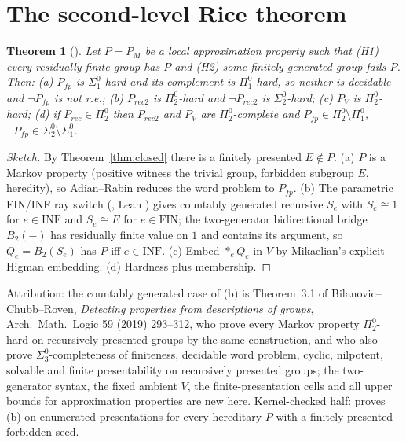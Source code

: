 \documentclass[11pt]{article}
\newtheorem{theorem}{Theorem}[section]
\theoremstyle{definition}
\newcommand{\Pizt}{\Pi^0_2}\newcommand{\Sizt}{\Sigma^0_2}\newcommand{\Pith}{\Pi^0_3}\newcommand{\Sith}{\Sigma^0_3}
\newcommand{\Sio}{\Sigma^0_1}\newcommand{\Pio}{\Pi^0_1}
\begin{document}
\section{The second-level Rice theorem}
\begin{theorem}[]\label{thm:rice}
Let $P=P_M$ be a local approximation property such that (H1) every residually finite group has $P$ and (H2) some finitely generated group fails $P$. Then: (a) $P_{fp}$ is $\Sio$-hard and its complement is $\Pio$-hard, so neither is decidable and $\neg P_{fp}$ is not r.e.; (b) $P_{rec2}$ is $\Pizt$-hard and $\neg P_{rec2}$ is $\Sizt$-hard; (c) $P_V$ is $\Pizt$-hard; (d) if $P_{rec}\in\Pizt$ then $P_{rec2}$ and $P_V$ are $\Pizt$-complete and $P_{fp}\in\Pizt\setminus\Pio$, $\neg P_{fp}\in\Sizt\setminus\Sio$.
\end{theorem}
\begin{proof}[Sketch]
By Theorem~\ref{thm:closed} there is a finitely presented $E\notin P$. (a) $P$ is a Markov property (positive witness the trivial group, forbidden subgroup $E$, heredity), so Adian--Rabin reduces the word problem to $P_{fp}$. (b) The parametric FIN/INF ray switch (, Lean ) gives countably generated recursive $S_e$ with $S_e\cong 1$ for $e\in\mathrm{INF}$ and $S_e\cong E$ for $e\in\mathrm{FIN}$; the two-generator bidirectional bridge $B_2(-)$ has residually finite value on $1$ and contains its argument, so $Q_e=B_2(S_e)$ has $P$ iff $e\in\mathrm{INF}$. (c) Embed $\ast_e Q_e$ in $V$ by Mikaelian's explicit Higman embedding. (d) Hardness plus membership.
\end{proof}
Attribution: the countably generated case of (b) is Theorem~3.1 of Bilanovic--Chubb--Roven, \emph{Detecting properties from descriptions of groups}, Arch.\ Math.\ Logic 59 (2019) 293--312, who prove every Markov property $\Pizt$-hard on recursively presented groups by the same construction, and who also prove $\Sith$-completeness of finiteness, decidable word problem, cyclic, nilpotent, solvable and finite presentability on recursively presented groups; the two-generator syntax, the fixed ambient $V$, the finite-presentation cells and all upper bounds for approximation properties are new here. Kernel-checked half:  proves (b) on enumerated presentations for every hereditary $P$ with a finitely presented forbidden seed.
\end{document}
